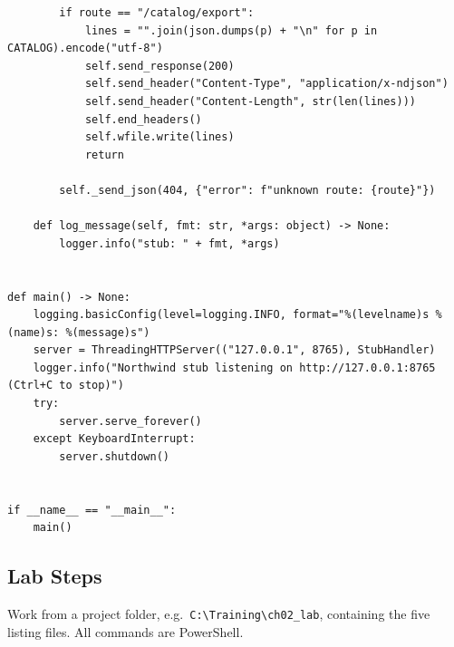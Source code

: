 \begin{verbatim}
        if route == "/catalog/export":
            lines = "".join(json.dumps(p) + "\n" for p in CATALOG).encode("utf-8")
            self.send_response(200)
            self.send_header("Content-Type", "application/x-ndjson")
            self.send_header("Content-Length", str(len(lines)))
            self.end_headers()
            self.wfile.write(lines)
            return

        self._send_json(404, {"error": f"unknown route: {route}"})

    def log_message(self, fmt: str, *args: object) -> None:
        logger.info("stub: " + fmt, *args)


def main() -> None:
    logging.basicConfig(level=logging.INFO, format="%(levelname)s %(name)s: %(message)s")
    server = ThreadingHTTPServer(("127.0.0.1", 8765), StubHandler)
    logger.info("Northwind stub listening on http://127.0.0.1:8765 (Ctrl+C to stop)")
    try:
        server.serve_forever()
    except KeyboardInterrupt:
        server.shutdown()


if __name__ == "__main__":
    main()
\end{verbatim}

\subsection{Lab Steps}

Work from a project folder, e.g.\ \texttt{C:\textbackslash Training\textbackslash ch02\_lab},
containing the five listing files. All commands are PowerShell.

